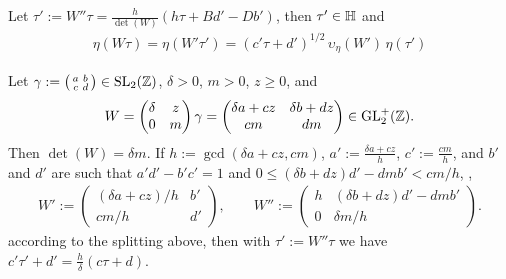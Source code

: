 \documentclass{article}
\begin{document}
Let $\tau' := W''\tau = \frac{h}{\det(W)}(h\tau + B d'- D b')$, then
$\tau'\in\mathbb{H}$ and
\begin{gather}
\eta(W\tau) =
\eta(W'\tau') =
(c'\tau+d')^{1/2}\,\upsilon_\eta(W')\,\eta(\tau')
\label{eq:eta-W-transformation}
\end{gather}




\begingroup
\newcommand{\h}{h}
\begin{Lemma}\label{thm:c*tau+d}
  Let $\gamma := \left(
    \begin{smallmatrix}a&b\\c&d\end{smallmatrix} \right)\in
  \SL2Z$, $\delta>0$, $m>0$, $z\ge0$, and
  \begin{gather*}
    W=
    \begin{pmatrix}
      \delta & z\\
      0      & m
    \end{pmatrix}
    \gamma
    = \begin{pmatrix}
        \delta a + c z & \delta b + d z\\
        c m & d m
      \end{pmatrix}
    \in \mathrm{GL}_2^+(\mathbb{Z}).
  \end{gather*}
  Then $\det(W)=\delta m$.
  If
  $\h:=\gcd(\delta a + c z, cm)$,
  $a':=\frac{\delta a + c z}{\h}$,
  $c':=\frac{c m}{\h}$, and
  $b'$ and $d'$ are such that $a'd'-b'c'=1$ and
  $0 \le (\delta b + d z) d' - d m b' < cm / \h$, \ie,
  \begin{gather*}
    W':=\begin{pmatrix}
      (\delta a + c z) / \h & b'\\
      c m / \h              & d'
    \end{pmatrix},
    \qquad
    W''
    :=
    \begin{pmatrix}
      \h & (\delta b + d z) d' - d m b'\\
      0  & \delta m / \h
    \end{pmatrix}.
  \end{gather*}
  according to the splitting above,
  then with $\tau':=W''\tau$ we have
  $c'\tau'+d' = \frac{\h}{\delta} (c\tau + d)$.
\end{Lemma}
\end{document}
